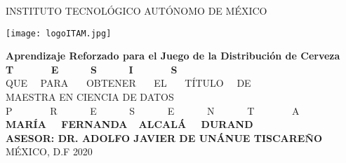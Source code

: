 
\begin{titlepage}
\begin{center}
\Large {INSTITUTO TECNOLÓGICO AUTÓNOMO DE MÉXICO}

 \vspace{0.5 cm}
  \centering
    \texttt{[image: logoITAM.jpg]}

 \vspace{0.5 cm}
 \textbf{Aprendizaje Reforzado para el Juego de la Distribuci\'on de Cerveza}
  \vspace{2 cm}\\
  \Huge{\textbf{T \ \ \ \ \ \ E \ \ \ \ \ S \ \ \ \ \ I \ \ \ \ \ \ S}}
    \vspace{.4cm}\\
  \Large{QUE  \ \ PARA \ \ \ OBTENER \ \ \ EL \ \ \ TÍTULO \ \ DE 
   \vspace{.4cm}\\
  MAESTRA EN CIENCIA DE DATOS 
   \vspace{.4cm}\\
  P \ \ \ \ \ \ \ R \ \ \ \ \ \ E \ \ \ \ \ \ S \ \ \ \ \ \ E \ \ \ \ \ \ N \ \ \ \ \ \ T \ \ \ \ \ \ \ A 
   \vspace{.4cm}\\
 \textbf{MAR\'IA \ \ FERNANDA\ \ ALCAL\'A \ \ DURAND}}
    \vspace{1 cm}\\
\normalsize \textbf{ASESOR: DR. ADOLFO JAVIER DE UN\'ANUE TISCARE\~NO}
\vspace{1cm}\\
MÉXICO, D.F \hfill{2020}
\end{center}
\end{titlepage}

